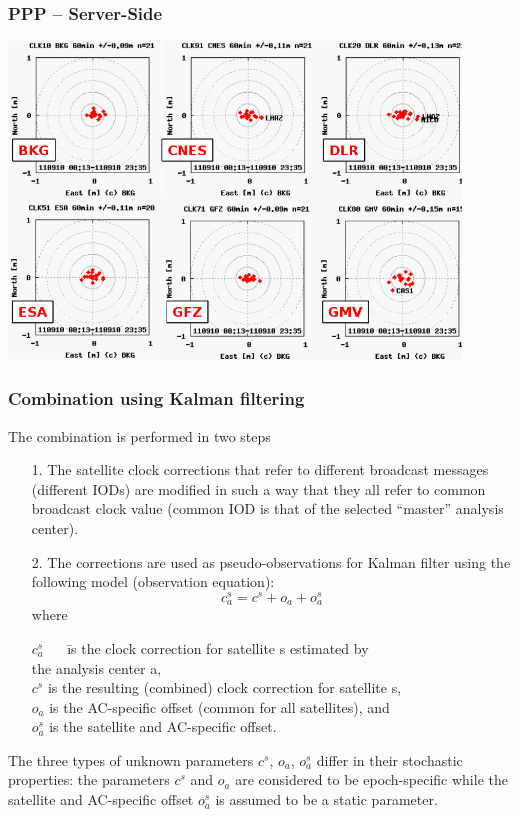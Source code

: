 \documentclass[10pt]{beamer}
\begin{document}

\begin{frame}
\frametitle{PPP -- Server-Side}
  \begin{center}
    \includegraphics[width=0.9\textwidth,angle=0]{ac_results2.png}
  \end{center}
\end{frame}


\begin{frame}
  \frametitle{Combination using Kalman filtering}
  The combination is performed in two steps
  \begin{itemize}
  \item[1.] The satellite clock corrections that refer to different broadcast
    messages (different IODs) are modified in such a way that they all refer
    to common broadcast clock value (common IOD is that of the selected
    ``master'' analysis center).
  \item[2.] The corrections are used as pseudo-observations for Kalman filter
    using the following model (observation equation):
    \begin{displaymath}
    c_a^s = c^s + o_a + o_a^s
    \end{displaymath}
    where
    \begin{tabbing}
    $c_a^s$ ~~ \= is the clock correction for satellite s estimated by \\
               \> the analysis center a, \\
    $c^s$      \> is the resulting (combined) clock correction for 
                  satellite s, \\
    $o_a$      \> is the AC-specific offset 
                  (common for all satellites), and \\
    $o_a^s$      \> is the satellite and AC-specific offset.
    \end{tabbing}
  \end{itemize}
  The three types of unknown parameters $c^s$, $o_a$, $o_a^s$ differ in their
  stochastic properties: the parameters $c^s$ and $o_a$ are considered to be
  epoch-specific while the satellite and AC-specific offset $o_a^s$ is assumed
  to be a static parameter.
\end{frame}
\end{document}
